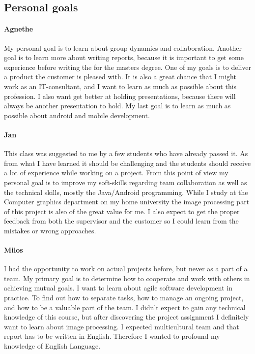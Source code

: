 \subsection{Personal goals}
\paragraph{Agnethe}

My personal goal is to learn about group dynamics and collaboration. Another goal is to learn more about writing reports, because it is important to get some experience before writing the for the masters degree. One of my goals is to deliver a product the customer is pleased with. It is also a great chance that I might work as an IT-consultant, and I want to learn as much as possible about this profession. I also want get better at holding presentations, because there will always be another presentation to hold. My last goal is to learn as much as possible about android and mobile development.

\paragraph{Jan}

This class was suggested to me by a few students who have already passed it. As from what I have learned it should be challenging and the students should receive a lot of experience while working on a project. From this point of view my personal goal is to improve my soft-skills regarding team collaboration as well as the technical skills, mostly the Java/Android programming. While I study at the Computer graphics department on my home university the image processing part of this project is also of the great value for me. I also expect to get the proper feedback from both the supervisor and the customer so I could learn from the mistakes or wrong approaches.

\paragraph{Milos}

I had the opportunity to work on actual projects before, but never as a part of a team. 
My primary goal is to determine how to cooperate and work with others in achieving mutual goals.
I want to learn about agile software development in practice.
To find out how to separate tasks, how to manage an ongoing project, and how to be a valuable part of the team.
I didn't expect to gain any technical knowledge of this course, but after discovering the project assignment I definitely want to learn about image processing.
I expected multicultural team and that report has to be written in English.
Therefore I wanted to profound my knowledge of English Language.

